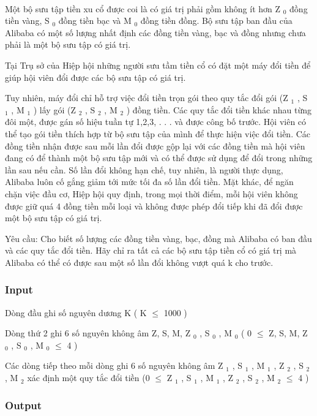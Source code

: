 

 

Một bộ sưu tập tiền xu cổ được coi là có giá trị phải gồm không ít hơn Z $_ 0 $ đồng tiền vàng, S $_ 0 $ đồng tiền bạc và M $_ 0 $ đồng tiền đồng. Bộ sưu tập ban đầu của Alibaba có một số lượng nhất định các đồng tiền vàng, bạc và đồng nhưng chưa phải là một bộ sưu tập có giá trị.

Tại Trụ sở của Hiệp hội những người sưu tầm tiền cổ có đặt một máy đổi tiền để giúp hội viên đổi được các bộ sưu tập có giá trị.

Tuy nhiên, máy đổi chỉ hỗ trợ việc đổi tiền trọn gói theo quy tắc đổi gói (Z $_ 1 $ , S $_ 1 $ , M $_ 1 $ ) lấy gói (Z $_ 2 $ , S $_ 2 $ , M $_ 2 $ ) đồng tiền. Các quy tắc đổi tiền khác nhau từng đôi một, được gán số hiệu tuần tự 1,2,3, . . . và được công bố trước. Hội viên có thể tạo gói tiền thích hợp từ bộ sưu tập của mình để thực hiện việc đổi tiền. Các đồng tiền nhận được sau mỗi lần đổi được gộp lại với các đồng tiền mà hội viên đang có để thành một bộ sưu tập mới và có thể được sử dụng để đổi trong những lần sau nếu cần. Số lần đổi không hạn chế, tuy nhiên, là người thực dụng, Alibaba luôn cố gắng giảm tới mức tối đa số lần đổi tiền. Mặt khác, để ngăn chặn việc đầu cơ, Hiệp hội quy định, trong mọi thời điểm, mỗi hội viên không được giữ quá 4 đồng tiền mỗi loại và không được phép đổi tiếp khi đã đổi được một bộ sưu tập có giá trị.

Yêu cầu: Cho biết số lượng các đồng tiền vàng, bạc, đồng mà Alibaba có ban đầu và các quy tắc đổi tiền. Hãy chỉ ra tất cả các bộ sưu tập tiền cổ có giá trị mà Alibaba có thể có được sau một số lần đổi không vượt quá k cho trước.

\subsubsection{Input}

Dòng đầu ghi số nguyên dương K ( K  $\le$  1000 )

Dòng thứ 2 ghi 6 số nguyên không âm Z, S, M, Z $_ 0 $ , S $_ 0 $ , M $_ 0 $ ( 0  $\le$  Z, S, M, Z $_ 0 $ , S $_ 0 $ , M $_ 0 $  $\le$  4 )

Các dòng tiếp theo mỗi dòng ghi 6 số nguyên không âm Z $_ 1 $ , S $_ 1 $ , M $_ 1 $ , Z $_ 2 $ , S $_ 2 $ , M $_ 2 $ xác định một quy tắc đổi tiền (0  $\le$  Z $_ 1 $ , S $_ 1 $ , M $_ 1 $ , Z $_ 2 $ , S $_ 2 $ , M $_ 2 $  $\le$  4 )

\subsubsection{Output}

